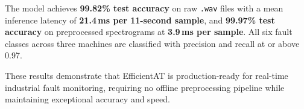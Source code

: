 \documentclass[12pt,a4paper]{article}
\begin{document}
\begin{highlightbox}
  The model achieves \textbf{99.82\% test accuracy} on raw \texttt{.wav} files with a mean inference latency of \textbf{21.4\,ms per 11-second sample}, and \textbf{99.97\% test accuracy} on preprocessed spectrograms at \textbf{3.9\,ms per sample}. All six fault classes across three machines are classified with precision and recall at or above 0.97.
\end{highlightbox}

These results demonstrate that EfficientAT is production-ready for real-time industrial fault monitoring, requiring no offline preprocessing pipeline while maintaining exceptional accuracy and speed.
\end{document}
